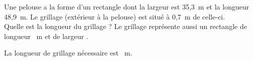 Une pelouse a la forme d'un rectangle dont la largeur est 35,3~m et la longueur 48,9~m. Le grillage (extérieur à la pelouse) est situé à 0,7~m de celle-ci.\\Quelle est la longueur du grillage ?
Le grillage représente aussi un rectangle de longueur ~m et de largeur .
\par
{}
\kern1.5cm\kern1.5cm\kern1.5cm La longueur de grillage nécessaire est ~m.
